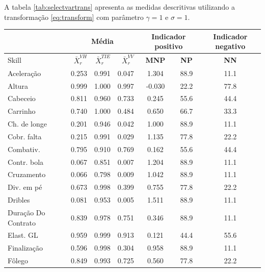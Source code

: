 \documentclass[review]{elsarticle}
\begin{document}
A tabela \ref{tab:selectvartrans} apresenta as medidas descritivas utilizando a transformação \ref{eq:transform} com parâmetro $\gamma=1$ e $\sigma=1$.

\begin{table}[ht]
\begin{small}
\begin{tabular}{l||rrr||cc|||c}
  \hline
     \hline
\rowcolor{SeaGreen3!30!} & \multicolumn{3}{c||}{Média} &   \multicolumn{2}{c||||}{Indicador positivo} & \multicolumn{1}{c}{Indicador negativo} \\
\hline 
  \hline
\rowcolor{SeaGreen3!30!} Skill &  $\bar{X}_r^{VH}$ &  $\bar{X}_r^{TIE}$ &  $\bar{X}_r^{VV}$ & \textbf{MNP } & \textbf{NP }& \textbf{NN }\\ 
 \hline
\rowcolor{gray!30!} Aceleração & 0.253 & 0.991 & 0.047 & 1.304 & 88.9 & 11.1 \\ 
\rowcolor{gray!10!} Altura & 0.999 & 1.000 & 0.997 & -0.030 & 22.2 & 77.8 \\ 
\rowcolor{gray!30!} Cabeceio & 0.811 & 0.960 & 0.733 & 0.245 & 55.6 & 44.4 \\ 
\rowcolor{gray!10!} Carrinho & 0.740 & 1.000 & 0.484 & 0.650 & 66.7 & 33.3 \\ 
\rowcolor{gray!30!} Ch. de longe & 0.201 & 0.946 & 0.042 & 1.000 & 88.9 & 11.1 \\ 
\rowcolor{gray!10!} Cobr. falta & 0.215 & 0.991 & 0.029 & 1.135 & 77.8 & 22.2 \\ 
\rowcolor{gray!30!} Combativ. & 0.795 & 0.910 & 0.769 & 0.162 & 55.6 & 44.4 \\ 
\rowcolor{gray!10!} Contr. bola & 0.067 & 0.851 & 0.007 & 1.204 & 88.9 & 11.1 \\ 
\rowcolor{gray!30!} Cruzamento & 0.066 & 0.798 & 0.009 & 1.042 & 88.9 & 11.1 \\ 
\rowcolor{gray!10!} Div. em pé & 0.673 & 0.998 & 0.399 & 0.755 & 77.8 & 22.2 \\ 
\rowcolor{gray!30!} Dribles & 0.081 & 0.953 & 0.005 & 1.511 & 88.9 & 11.1 \\ 
\rowcolor{gray!10!} Duração Do Contrato & 0.839 & 0.978 & 0.751 & 0.346 & 88.9 & 11.1 \\ 
\rowcolor{gray!30!} Elast. GL & 0.959 & 0.999 & 0.913 & 0.121 & 44.4 & 55.6 \\ 
\rowcolor{gray!10!} Finalização & 0.596 & 0.998 & 0.304 & 0.958 & 88.9 & 11.1 \\ 
\rowcolor{gray!30!} Fôlego & 0.849 & 0.993 & 0.725 & 0.560 & 77.8 & 22.2 \\ 

\end{tabular}
\end{small}
\end{table}
\end{document}
